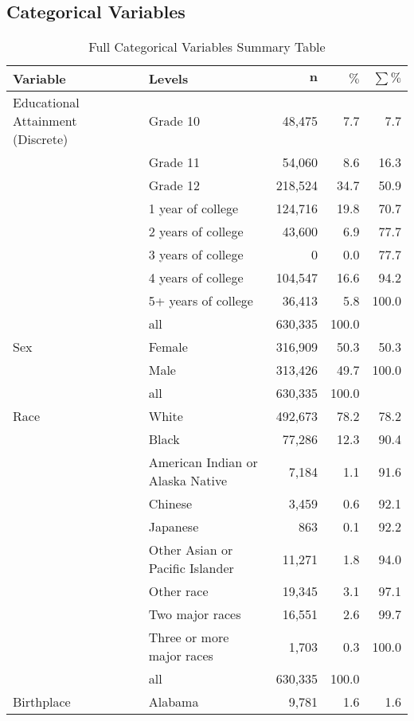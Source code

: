 \subsection{Categorical Variables}
    \begingroup\tiny
    \begin{longtable}{ll|rrr}
    \caption{Full Categorical Variables Summary Table} \\
    \label{app_cat.var_table}
     \textbf{Variable} & \textbf{Levels} & $\mathbf{n}$ & $\mathbf{\%}$ & $\mathbf{\sum \%}$ \\ 
      \hline
    Educational Attainment (Discrete) & Grade 10 & 48,475 & 7.7 & 7.7 \\ 
    & Grade 11 & 54,060 & 8.6 & 16.3 \\ 
    & Grade 12 & 218,524 & 34.7 & 50.9 \\ 
    & 1 year of college & 124,716 & 19.8 & 70.7 \\ 
    & 2 years of college & 43,600 & 6.9 & 77.7 \\ 
    & 3 years of college & 0 & 0.0 & 77.7 \\ 
    & 4 years of college & 104,547 & 16.6 & 94.2 \\ 
    & 5+ years of college & 36,413 & 5.8 & 100.0 \\ 
    \hline
    & all & 630,335 & 100.0 &  \\ 
    \hline
    \hline
    Sex & Female & 316,909 & 50.3 & 50.3 \\ 
    & Male & 313,426 & 49.7 & 100.0 \\ 
    \hline
    & all & 630,335 & 100.0 &  \\ 
    \hline
    \hline
    Race & White & 492,673 & 78.2 & 78.2 \\ 
    & Black & 77,286 & 12.3 & 90.4 \\ 
    & American Indian or Alaska Native & 7,184 & 1.1 & 91.6 \\ 
    & Chinese & 3,459 & 0.6 & 92.1 \\ 
    & Japanese & 863 & 0.1 & 92.2 \\ 
    & Other Asian or Pacific Islander & 11,271 & 1.8 & 94.0 \\ 
    & Other race & 19,345 & 3.1 & 97.1 \\ 
    & Two major races & 16,551 & 2.6 & 99.7 \\ 
    & Three or more major races & 1,703 & 0.3 & 100.0 \\ 
    \hline
    & all & 630,335 & 100.0 &  \\ 
    \hline
    \hline
    Birthplace & Alabama & 9,781 & 1.6 & 1.6 \\ 

\end{longtable}
